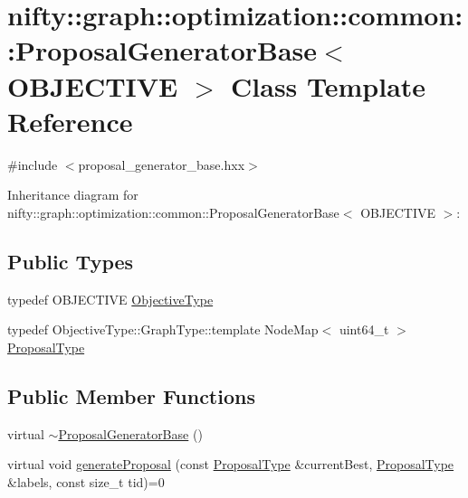 \hypertarget{classnifty_1_1graph_1_1optimization_1_1common_1_1ProposalGeneratorBase}{}\section{nifty\+:\+:graph\+:\+:optimization\+:\+:common\+:\+:Proposal\+Generator\+Base$<$ O\+B\+J\+E\+C\+T\+I\+V\+E $>$ Class Template Reference}
\label{classnifty_1_1graph_1_1optimization_1_1common_1_1ProposalGeneratorBase}


{\ttfamily \#include $<$proposal\+\_\+generator\+\_\+base.\+hxx$>$}



Inheritance diagram for nifty\+:\+:graph\+:\+:optimization\+:\+:common\+:\+:Proposal\+Generator\+Base$<$ O\+B\+J\+E\+C\+T\+I\+V\+E $>$\+:
\subsection*{Public Types}
\begin{DoxyCompactItemize}
\item 
typedef O\+B\+J\+E\+C\+T\+I\+V\+E \hyperlink{classnifty_1_1graph_1_1optimization_1_1common_1_1ProposalGeneratorBase_a26b2bcec6047d728078e1dc78d934876}{Objective\+Type}
\item 
typedef Objective\+Type\+::\+Graph\+Type\+::template Node\+Map$<$ uint64\+\_\+t $>$ \hyperlink{classnifty_1_1graph_1_1optimization_1_1common_1_1ProposalGeneratorBase_a4700eb43beb708a77c5c34612039c715}{Proposal\+Type}
\end{DoxyCompactItemize}
\subsection*{Public Member Functions}
\begin{DoxyCompactItemize}
\item 
virtual \hyperlink{classnifty_1_1graph_1_1optimization_1_1common_1_1ProposalGeneratorBase_a4c5363ab4380df824d4c7a6371e2a23c}{$\sim$\+Proposal\+Generator\+Base} ()
\item 
virtual void \hyperlink{classnifty_1_1graph_1_1optimization_1_1common_1_1ProposalGeneratorBase_a5751b664edd5f19a0232b3d6527a4135}{generate\+Proposal} (const \hyperlink{classnifty_1_1graph_1_1optimization_1_1common_1_1ProposalGeneratorBase_a4700eb43beb708a77c5c34612039c715}{Proposal\+Type} \&current\+Best, \hyperlink{classnifty_1_1graph_1_1optimization_1_1common_1_1ProposalGeneratorBase_a4700eb43beb708a77c5c34612039c715}{Proposal\+Type} \&labels, const size\+\_\+t tid)=0
\end{DoxyCompactItemize}


